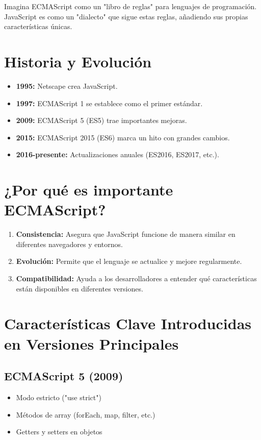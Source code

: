 \documentclass{book}
\begin{document}
Imagina ECMAScript como un "libro de reglas" para lenguajes de programación. JavaScript es como un "dialecto" que sigue estas reglas, añadiendo sus propias características únicas.

\section{Historia y Evolución}

\begin{itemize}
    \item \textbf{1995:} Netscape crea JavaScript.
    \item \textbf{1997:} ECMAScript 1 se establece como el primer estándar.
    \item \textbf{2009:} ECMAScript 5 (ES5) trae importantes mejoras.
    \item \textbf{2015:} ECMAScript 2015 (ES6) marca un hito con grandes cambios.
    \item \textbf{2016-presente:} Actualizaciones anuales (ES2016, ES2017, etc.).
\end{itemize}

\section{¿Por qué es importante ECMAScript?}

\begin{enumerate}
    \item \textbf{Consistencia:} Asegura que JavaScript funcione de manera similar en diferentes navegadores y entornos.
    \item \textbf{Evolución:} Permite que el lenguaje se actualice y mejore regularmente.
    \item \textbf{Compatibilidad:} Ayuda a los desarrolladores a entender qué características están disponibles en diferentes versiones.
\end{enumerate}

\section{Características Clave Introducidas en Versiones Principales}

\subsection{ECMAScript 5 (2009)}
\begin{itemize}
    \item Modo estricto ("use strict")
    \item Métodos de array (forEach, map, filter, etc.)
    \item Getters y setters en objetos
\end{itemize}
\end{document}
